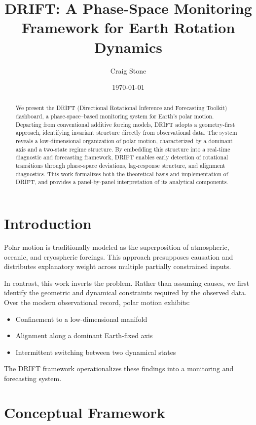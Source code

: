 \documentclass[11pt]{article}
\title{\textbf{DRIFT: A Phase-Space Monitoring Framework for Earth Rotation Dynamics}}
\author{Craig Stone}
\date{\today}
\begin{document}
\maketitle

\begin{abstract}
We present the DRIFT (Directional Rotational Inference and Forecasting Toolkit) dashboard, a phase-space–based monitoring system for Earth’s polar motion. Departing from conventional additive forcing models, DRIFT adopts a geometry-first approach, identifying invariant structure directly from observational data. The system reveals a low-dimensional organization of polar motion, characterized by a dominant axis and a two-state regime structure. By embedding this structure into a real-time diagnostic and forecasting framework, DRIFT enables early detection of rotational transitions through phase-space deviations, lag-response structure, and alignment diagnostics. This work formalizes both the theoretical basis and implementation of DRIFT, and provides a panel-by-panel interpretation of its analytical components.
\end{abstract}

\section{Introduction}

Polar motion is traditionally modeled as the superposition of atmospheric, oceanic, and cryospheric forcings. This approach presupposes causation and distributes explanatory weight across multiple partially constrained inputs.

In contrast, this work inverts the problem. Rather than assuming causes, we first identify the geometric and dynamical constraints required by the observed data. Over the modern observational record, polar motion exhibits:

\begin{itemize}
\item Confinement to a low-dimensional manifold
\item Alignment along a dominant Earth-fixed axis
\item Intermittent switching between two dynamical states
\end{itemize}

The DRIFT framework operationalizes these findings into a monitoring and forecasting system.

\section{Conceptual Framework}
\end{document}
